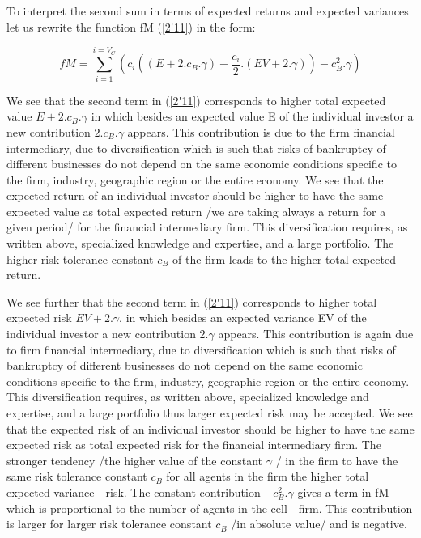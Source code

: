 \documentclass[10pt]{article}
\begin{document}
To interpret the second sum in terms of expected returns and expected variances let us rewrite the function fM (\ref{2'11}) in the form:

\begin{equation}
\label{2'111}
fM = \sum_{i=1}^{i=V_{C}} (c_{i}((E + 2.c_{B}.\gamma)-\frac{c_{i}}{2}.(EV + 2.\gamma)) - c_{B}^{2}. \gamma )
\end{equation}

We see that the second term in (\ref{2'11}) corresponds to higher total expected value $E + 2.c_{B}.\gamma$ in which besides an expected value E of the individual investor a new contribution $2.c_{B}.\gamma$ appears. This contribution is due to the firm financial intermediary, due to diversification which is such that risks of bankruptcy of different businesses do not depend on the same economic conditions specific to the firm, industry, geographic region or the entire economy.
We see that the expected return of an individual investor should be higher to have the same expected value as total expected return /we are taking always a return for a given period/ for the financial intermediary firm. This diversification requires, as written above, specialized knowledge and expertise, and a large portfolio. The higher risk tolerance constant $ c_{B} $ of the firm leads to the higher total expected return.

We see further that the second term in (\ref{2'11}) corresponds to higher total expected risk $EV + 2.\gamma$, in which besides an expected variance EV of the individual investor a new contribution $2.\gamma$ appears. This contribution is again due to firm financial intermediary, due to
diversification which is such that risks of bankruptcy of different businesses do not depend on the same economic conditions specific to the firm, industry, geographic region or the entire economy. This diversification requires, as written above, specialized knowledge and expertise, and a large portfolio thus larger expected risk may be accepted.
We see that the expected risk of an individual investor should be higher to have the same  expected risk as total expected risk for the financial intermediary firm.
The stronger tendency /the higher value of the constant $\gamma$ / in the firm to have the same risk tolerance constant $ c_{B} $ for all agents in the firm the higher total expected variance - risk. The constant contribution $- c_{B}^{2}. \gamma$ gives a term in fM which is proportional to the number of agents in the cell - firm. This contribution is larger for larger risk tolerance constant $ c_{B} $ /in absolute value/ and is negative.
\end{document}
